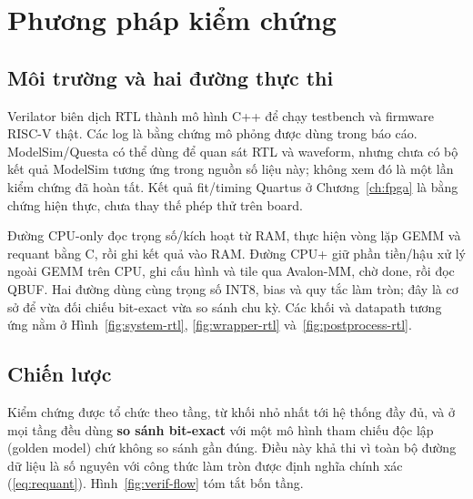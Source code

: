 \chapter{Phương pháp kiểm chứng}
\label{ch:verif}

\section{Môi trường và hai đường thực thi}
Verilator biên dịch RTL thành mô hình C++ để chạy testbench và firmware RISC-V thật. Các log  là bằng chứng mô phỏng được dùng trong báo cáo. ModelSim/Questa có thể dùng để quan sát RTL và waveform, nhưng chưa có bộ kết quả ModelSim tương ứng trong nguồn số liệu này; không xem đó là một lần kiểm chứng đã hoàn tất. Kết quả fit/timing Quartus ở Chương~\ref{ch:fpga} là bằng chứng hiện thực, chưa thay thế phép thử trên board.

Đường CPU-only đọc trọng số/kích hoạt từ RAM, thực hiện vòng lặp GEMM và requant bằng C, rồi ghi kết quả vào RAM. Đường CPU+\NPU{} giữ phần tiền/hậu xử lý ngoài GEMM trên CPU, ghi cấu hình và tile qua Avalon-MM, chờ done, rồi đọc QBUF. Hai đường dùng cùng trọng số INT8, bias và quy tắc làm tròn; đây là cơ sở để vừa đối chiếu bit-exact vừa so sánh chu kỳ. Các khối và datapath tương ứng nằm ở Hình~\ref{fig:system-rtl}, \ref{fig:wrapper-rtl} và~\ref{fig:postprocess-rtl}.

\section{Chiến lược}
Kiểm chứng được tổ chức theo tầng, từ khối nhỏ nhất tới hệ thống đầy đủ, và ở mọi tầng đều dùng \textbf{so sánh bit-exact} với một mô hình tham chiếu độc lập (golden model) chứ không so sánh gần đúng. Điều này khả thi vì toàn bộ đường dữ liệu là số nguyên với công thức làm tròn được định nghĩa chính xác (\eqref{eq:requant}). Hình~\ref{fig:verif-flow} tóm tắt bốn tầng.


